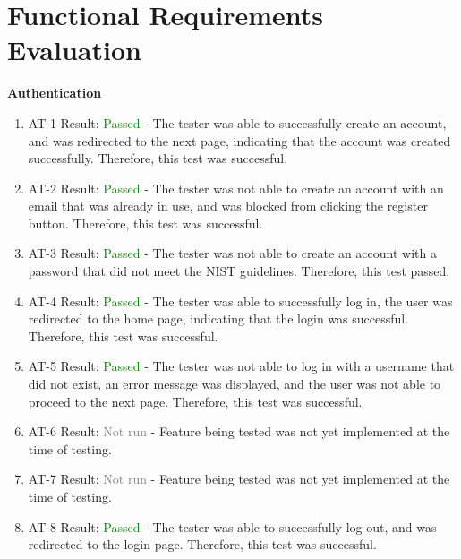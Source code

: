 \documentclass[12pt, titlepage]{article}
\begin{document}
\newpage

\tableofcontents

\listoftables %

\listoffigures %

\newpage


\section{Functional Requirements Evaluation}

\noindent\large{\textbf{Authentication}}

\normalsize

\begin{enumerate}
  \item AT-1
        Result: \textcolor{green}{Passed} - The tester was able to successfully create an account, and was redirected to the next page,
        indicating that the account was created successfully. Therefore, this test was successful.
  \item AT-2
        Result: \textcolor{green}{Passed} - The tester was not able to create an account with an email that was already in use,
        and was blocked from clicking the register button. Therefore, this test was successful.
  \item AT-3
        Result: \textcolor{green}{Passed} - The tester was not able to create an account with a password that did not meet the NIST guidelines.
        Therefore, this test passed.
  \item AT-4
        Result: \textcolor{green}{Passed} - The tester was able to successfully log in, the user was redirected to the home page,
        indicating that the login was successful. Therefore, this test was successful.
  \item AT-5
        Result: \textcolor{green}{Passed} - The tester was not able to log in with a username that did not exist, an error message was displayed,
        and the user was not able to proceed to the next page. Therefore, this test was successful.
  \item AT-6
        Result: \textcolor{gray}{Not run} - Feature being tested was not yet implemented at the time of testing.
  \item AT-7
        Result: \textcolor{gray}{Not run} - Feature being tested was not yet implemented at the time of testing.
  \item AT-8
        Result: \textcolor{green}{Passed} - The tester was able to successfully log out, and was redirected to the login page.
        Therefore, this test was successful.
\end{enumerate}
\end{document}
